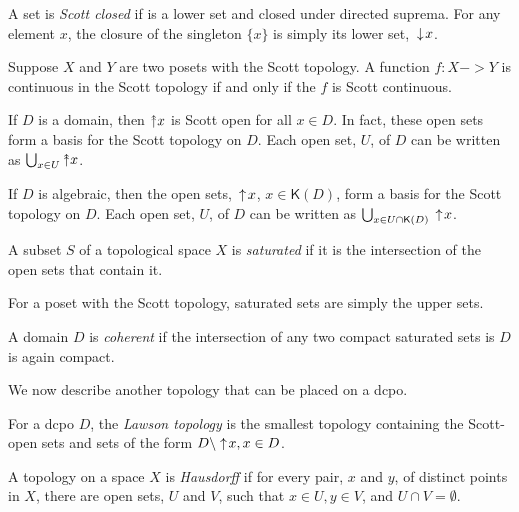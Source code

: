 A set is \emph{Scott closed} if is a lower set and closed under directed suprema.  For any element $x$, the closure of the singleton $\{x\}$ is simply its lower set, $\,\downarrow\! x$.

\begin{proposition}
Suppose $X$ and $Y$ are two posets with the Scott topology.  A function $f:X->Y$ is continuous in the Scott topology if and only if the $f$ is Scott continuous. 
\end{proposition}

\begin{proposition}
If $D$ is a domain, then $\Ua x$ is Scott open for all $x\in D$.  In fact, these open sets form a basis for the Scott topology on $D$.  Each open set, $U$, of $D$ can be written as $\bigcup_{x\in U} \Ua x$.
\end{proposition}

\begin{proposition}
If $D$ is algebraic, then the open sets, $\,\uparrow\! x$, $x\in \mathsf{K}(D)$, form a basis for the Scott topology on $D$.  Each open set, $U$, of $D$ can be written as $\bigcup_{x\in U\cap\mathsf{K}(D)} \,\uparrow\! x$. 
\end{proposition}

\begin{definition}
A subset $S$ of a topological space $X$ is \emph{saturated} if it is the intersection of the open sets that contain it.
\end{definition}

For a poset with the Scott topology, saturated sets are simply the upper sets.

\begin{definition}
A domain $D$ is \emph{coherent} if the intersection of any two compact saturated sets is $D$ is again compact.
\end{definition}

We now describe another topology that can be placed on a dcpo.

\begin{definition}
For a dcpo $D$, the \emph{Lawson topology} is the smallest topology containing the Scott-open sets and sets of the form $D\setminus\! \,\uparrow\! x, x\in D$.
\end{definition}

\begin{definition}
A topology on a space $X$ is \emph{Hausdorff} if for every pair, $x$ and $y$, of distinct points in $X$, there are open sets, $U$ and $V$, such that $x\in U, y\in V$, and $U\cap V = \emptyset$.
\end{definition}

